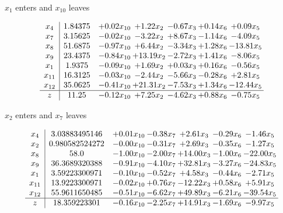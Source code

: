 \documentclass[8pt]{article}
\begin{document}
 $ x_{1} $ enters and $ x_{10} $ leaves 

 \[\begin{array}{c| c c@{\hskip 2pt} c@{\hskip 2pt} c@{\hskip 2pt} c@{\hskip 2pt} c@{\hskip 2pt} }
 x_{4}   &  1.84375 & +  0.02 x_{10} & +  1.22 x_{2} & -0.67 x_{3} & +  0.14 x_{6} & +  0.09 x_{5}\\
 x_{7}   &  3.15625 & -0.02 x_{10} & -3.22 x_{2} & +  8.67 x_{3} & -1.14 x_{6} & -4.09 x_{5}\\
 x_{8}   &  51.6875 & -0.97 x_{10} & +  6.44 x_{2} & -3.34 x_{3} & +  1.28 x_{6} & -13.81 x_{5}\\
 x_{9}   &  23.4375 & -0.84 x_{10} & + 13.19 x_{2} & -2.72 x_{3} & +  1.41 x_{6} & -8.06 x_{5}\\
 x_{1}   &  1.9375 & -0.09 x_{10} & +  1.69 x_{2} & +  0.03 x_{3} & +  0.16 x_{6} & -0.56 x_{5}\\
 x_{11}   &  16.3125 & -0.03 x_{10} & -2.44 x_{2} & -5.66 x_{3} & -0.28 x_{6} & +  2.81 x_{5}\\
 x_{12}   &  35.0625 & -0.41 x_{10} & + 21.31 x_{2} & -7.53 x_{3} & +  1.34 x_{6} & -12.44 x_{5}\\
\hline
z    &  11.25 & -0.12 x_{10} & +  7.25 x_{2} & -4.62 x_{3} & +  0.88 x_{6} & -0.75 x_{5}\\
\end{array}\]


 $ x_{2} $ enters and $ x_{7} $ leaves 

 \[\begin{array}{c| c c@{\hskip 2pt} c@{\hskip 2pt} c@{\hskip 2pt} c@{\hskip 2pt} c@{\hskip 2pt} }
 x_{4}   &  3.03883495146 & +  0.01 x_{10} & -0.38 x_{7} & +  2.61 x_{3} & -0.29 x_{6} & -1.46 x_{5}\\
 x_{2}   &  0.980582524272 & -0.00 x_{10} & -0.31 x_{7} & +  2.69 x_{3} & -0.35 x_{6} & -1.27 x_{5}\\
 x_{8}   &  58.0 & -1.00 x_{10} & -2.00 x_{7} & + 14.00 x_{3} & -1.00 x_{6} & -22.00 x_{5}\\
 x_{9}   &  36.3689320388 & -0.91 x_{10} & -4.10 x_{7} & + 32.81 x_{3} & -3.27 x_{6} & -24.83 x_{5}\\
 x_{1}   &  3.59223300971 & -0.10 x_{10} & -0.52 x_{7} & +  4.58 x_{3} & -0.44 x_{6} & -2.71 x_{5}\\
 x_{11}   &  13.9223300971 & -0.02 x_{10} & +  0.76 x_{7} & -12.22 x_{3} & +  0.58 x_{6} & +  5.91 x_{5}\\
 x_{12}   &  55.9611650485 & -0.51 x_{10} & -6.62 x_{7} & + 49.89 x_{3} & -6.21 x_{6} & -39.54 x_{5}\\
\hline
z    &  18.359223301 & -0.16 x_{10} & -2.25 x_{7} & + 14.91 x_{3} & -1.69 x_{6} & -9.97 x_{5}\\
\end{array}\]
\end{document}
